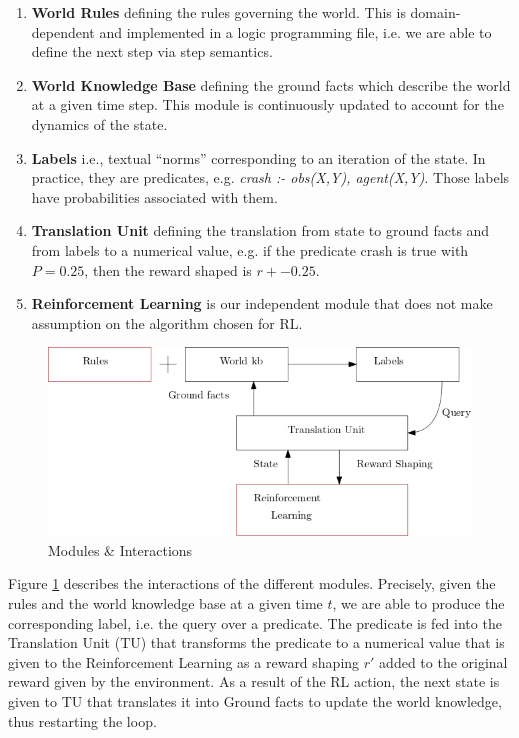 \begin{enumerate}
  \item \textbf{World Rules} defining the rules governing the world. This is domain-dependent and implemented 
        in a logic programming file, i.e. we are able to define the next step via step semantics.
  \item \textbf{World Knowledge Base} defining the ground facts which describe the world at a given time step. This module is 
        continuously updated to account for the dynamics of the
        state. 
  \item \textbf{Labels} i.e., textual ``norms'' corresponding to an
  iteration of the state. In practice, they are predicates, e.g. \textit{crash :- obs(X,Y), agent(X,Y)}. 
                    Those labels have probabilities associated with
                    them.
  \item \textbf{Translation Unit} defining the translation from state to ground facts and from labels to a numerical value, e.g. if the predicate crash is true with $P = 0.25$, then the reward shaped is $r + -0.25$. 
  \item \textbf{Reinforcement Learning} is our independent module that does not make assumption on the algorithm chosen for RL.
\end{enumerate}


\begin{figure}[H]
  \centering
  \includegraphics[scale=0.55]{figures/dynamics.png}
  \caption{Modules \& Interactions}
  \label{fig:mods}
\end{figure}

Figure \ref{fig:mods} describes the interactions of the different modules. Precisely, 
given the rules and the world knowledge base at a given time $t$, we are able 
to produce the corresponding label, i.e. the query over a predicate. The predicate is fed 
into the Translation Unit (TU) that transforms the predicate to a numerical value that is given to the Reinforcement Learning 
as a reward shaping $r'$ added to the original reward given by the
environment. As a result of the RL action, the next state is given 
to TU that translates it into Ground facts to update the world
knowledge, thus restarting the loop.
